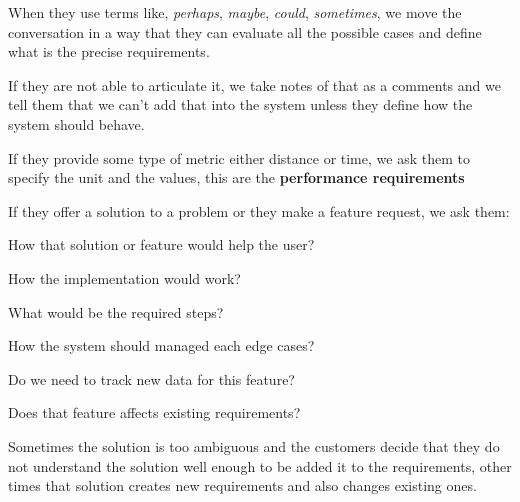 \noindent When they use terms like, \textit{perhaps}, \textit{maybe}, 
\textit{could}, \textit{sometimes}, we move the conversation in a way that 
they can evaluate all the possible cases and define what is the precise 
requirements.  \newline

\noindent If they are not able to articulate it, we take notes of that as a 
comments and we tell them that we can't add that into the system unless they 
define how the system should behave.

\pagebreak

\noindent If they provide some type of metric either distance or time, we ask 
them to specify the unit and the values, this are the
\textbf{performance requirements} \newline

\noindent If they offer a solution to a problem or they make a feature
request, we ask them:
\begin{packed_enum}
    \item How that solution or feature would help the user?
    \item How the implementation would work?
    \item What would be the required steps?
    \item How the system should managed each edge cases?
    \item Do we need to track new data for this feature?
    \item Does that feature affects existing requirements?
\end{packed_enum}
 
\noindent Sometimes the solution is too ambiguous and the customers decide that they do 
not understand the solution well enough to be added it to the requirements, 
other times that solution creates new requirements and also changes 
existing ones. \newline
